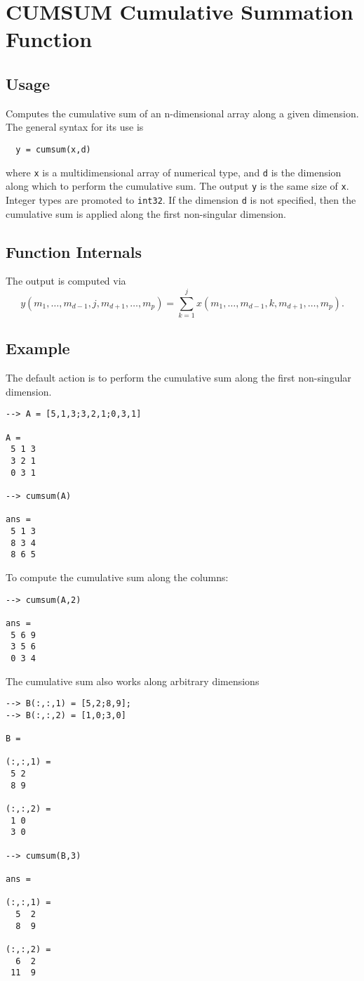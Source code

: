 \section{CUMSUM Cumulative Summation Function}

\subsection{Usage}

Computes the cumulative sum of an n-dimensional array along a given
dimension.  The general syntax for its use is
\begin{verbatim}
  y = cumsum(x,d)
\end{verbatim}
where \verb|x| is a multidimensional array of numerical type, and \verb|d|
is the dimension along which to perform the cumulative sum.  The
output \verb|y| is the same size of \verb|x|.  Integer types are promoted
to \verb|int32|. If the dimension \verb|d| is not specified, then the
cumulative sum is applied along the first non-singular dimension.
\subsection{Function Internals}

The output is computed via
\[
  y(m_1,\ldots,m_{d-1},j,m_{d+1},\ldots,m_{p}) = 
  \sum_{k=1}^{j} x(m_1,\ldots,m_{d-1},k,m_{d+1},\ldots,m_{p}).
\]
\subsection{Example}

The default action is to perform the cumulative sum along the
first non-singular dimension.
\begin{verbatim}
--> A = [5,1,3;3,2,1;0,3,1]

A = 
 5 1 3 
 3 2 1 
 0 3 1 

--> cumsum(A)

ans = 
 5 1 3 
 8 3 4 
 8 6 5 
\end{verbatim}
To compute the cumulative sum along the columns:
\begin{verbatim}
--> cumsum(A,2)

ans = 
 5 6 9 
 3 5 6 
 0 3 4 
\end{verbatim}
The cumulative sum also works along arbitrary dimensions
\begin{verbatim}
--> B(:,:,1) = [5,2;8,9];
--> B(:,:,2) = [1,0;3,0]

B = 

(:,:,1) = 
 5 2 
 8 9 

(:,:,2) = 
 1 0 
 3 0 

--> cumsum(B,3)

ans = 

(:,:,1) = 
  5  2 
  8  9 

(:,:,2) = 
  6  2 
 11  9 
\end{verbatim}
